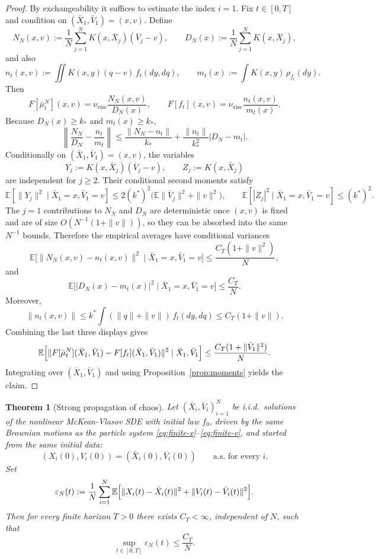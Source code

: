 \documentclass[11pt]{article}
\newtheorem{theorem}{Theorem}[section]
\theoremstyle{definition}
\theoremstyle{remark}
\newcommand{\E}{\mathbb{E}}
\begin{document}
\begin{proof}
By exchangeability it suffices to estimate the index $i=1$. Fix $t\in[0,T]$
and condition on $(\bar X_1,\bar V_1)=(x,v)$. Define
\[
N_N(x,v):=\frac1N\sum_{j=1}^N K(x,\bar X_j)(\bar V_j-v),
\qquad
D_N(x):=\frac1N\sum_{j=1}^N K(x,\bar X_j),
\]
and also
\[
n_t(x,v):=\iint K(x,y)(q-v)\,f_t(dy,dq),
\qquad
m_t(x):=\int K(x,y)\,\rho_{f_t}(dy).
\]
Then
\[
F[\bar\mu_t^N](x,v)=\nu_{\mathrm{visc}}\frac{N_N(x,v)}{D_N(x)},
\qquad
F[f_t](x,v)=\nu_{\mathrm{visc}}\frac{n_t(x,v)}{m_t(x)}.
\]
Because $D_N(x)\geq k_*$ and $m_t(x)\geq k_*$,
\[
\left\|
\frac{N_N}{D_N}-\frac{n_t}{m_t}
\right\|
\leq
\frac{\|N_N-n_t\|}{k_*}
+\frac{\|n_t\|}{k_*^2}|D_N-m_t|.
\]
Conditionally on $(\bar X_1,\bar V_1)=(x,v)$, the variables
\[
Y_j:=K(x,\bar X_j)(\bar V_j-v),
\qquad
Z_j:=K(x,\bar X_j)
\]
are independent for $j\geq2$. Their conditional second moments satisfy
\[
\E[\|Y_j\|^2\mid \bar X_1=x,\bar V_1=v]
\leq
2(k^*)^2\bigl(\E\|\bar V_j\|^2+\|v\|^2\bigr),
\qquad
\E[|Z_j|^2\mid \bar X_1=x,\bar V_1=v]\leq (k^*)^2.
\]
The $j=1$ contributions to $N_N$ and $D_N$ are deterministic once $(x,v)$ is
fixed and are of size $O(N^{-1}(1+\|v\|))$, so they can be absorbed into the
same $N^{-1}$ bounds.
Therefore the empirical averages have conditional variances
\[
\E\bigl[\|N_N(x,v)-n_t(x,v)\|^2\mid \bar X_1=x,\bar V_1=v\bigr]
\leq
\frac{C_T(1+\|v\|^2)}{N},
\]
and
\[
\E\bigl[|D_N(x)-m_t(x)|^2\mid \bar X_1=x,\bar V_1=v\bigr]
\leq
\frac{C_T}{N}.
\]
Moreover,
\[
\|n_t(x,v)\|
\leq
k^*\int (\|q\|+\|v\|)\,f_t(dy,dq)
\leq
C_T(1+\|v\|).
\]
Combining the last three displays gives
\[
\E\Bigl[
\|F[\bar\mu_t^N](\bar X_1,\bar V_1)-F[f_t](\bar X_1,\bar V_1)\|^2
\mid \bar X_1,\bar V_1
\Bigr]
\leq
\frac{C_T(1+\|\bar V_1\|^2)}{N}.
\]
Integrating over $(\bar X_1,\bar V_1)$ and using
Proposition~\ref{prop:moments} yields the claim.
\end{proof}

\begin{theorem}[Strong propagation of chaos]\label{thm:poc-strong}
Let $(\bar X_i,\bar V_i)_{i=1}^N$ be i.i.d.\ solutions of the nonlinear
McKean-Vlasov SDE with initial law $f_0$, driven by the same Brownian motions
as the particle system \eqref{eq:finite-x}--\eqref{eq:finite-v}, and started
from the same initial data:
\[
(X_i(0),V_i(0))=(\bar X_i(0),\bar V_i(0))
\qquad
\text{a.s.\ for every }i.
\]
Set
\[
\varepsilon_N(t):=
\frac1N\sum_{i=1}^N
\E\Bigl[\|X_i(t)-\bar X_i(t)\|^2+\|V_i(t)-\bar V_i(t)\|^2\Bigr].
\]
Then for every finite horizon $T>0$ there exists $C_T<\infty$,
independent of $N$, such that
\[
\sup_{t\in[0,T]}\varepsilon_N(t)\leq \frac{C_T}{N}.
\]
\end{theorem}
\end{document}
